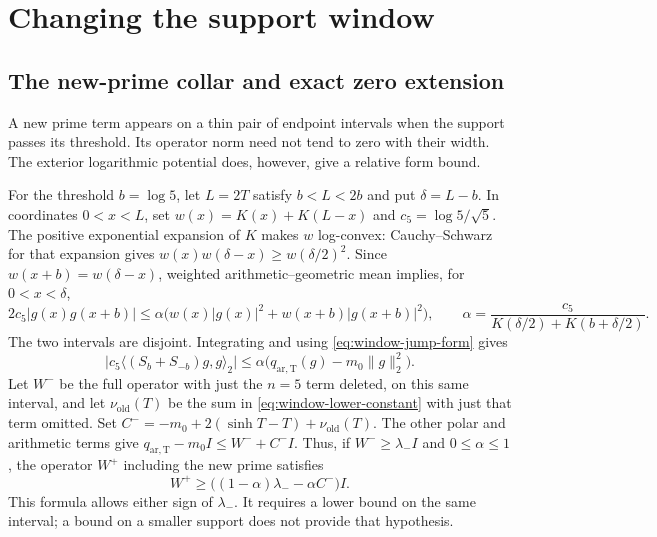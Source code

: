 \documentclass[11pt]{article}
\theoremstyle{definition}
\theoremstyle{remark}
\numberwithin{equation}{section}
\begin{document}


\section{Changing the support window}
\label{sec:window-cofinal}

\subsection{The new-prime collar and exact zero extension}

A new prime term appears on a thin pair of endpoint intervals when
the support passes its threshold.  Its operator norm need not tend
to zero with their width.  The exterior logarithmic potential does,
however, give a relative form bound.

For the threshold $b=\log5$, let $L=2T$ satisfy $b<L<2b$ and
put $\delta=L-b$.  In coordinates $0<x<L$, set
$w(x)=K(x)+K(L-x)$ and $c_5=\log5/\sqrt5$.
The positive exponential expansion of $K$ makes $w$ log-convex:
Cauchy--Schwarz for that expansion gives
$w(x)w(\delta-x)\ge w(\delta/2)^2$.
Since $w(x+b)=w(\delta-x)$, weighted arithmetic--geometric mean
implies, for $0<x<\delta$,
\[
 2c_5|g(x)g(x+b)|
 \le\alpha\bigl(w(x)|g(x)|^2+w(x+b)|g(x+b)|^2\bigr),
 \qquad
 \alpha=\frac{c_5}{K(\delta/2)+K(b+\delta/2)}.
\]
The two intervals are disjoint.  Integrating and using
\eqref{eq:window-jump-form} gives
\begin{equation}
 \bigl|c_5\langle(S_b+S_{-b})g,g\rangle_2\bigr|
  \le\alpha\bigl(q_{\mathrm{ar,T}}(g)-m_0\|g\|_2^2\bigr).
 \label{eq:window-collar-relative}
\end{equation}
Let $W^-$ be the full operator with just the $n=5$ term deleted,
on this same interval, and let $\nu_{\mathrm{old}}(T)$ be the sum in
\eqref{eq:window-lower-constant} with just that term omitted.
Set
$C^-=-m_0+2(\sinh T-T)+\nu_{\mathrm{old}}(T)$.
The other polar and arithmetic terms give
$q_{\mathrm{ar,T}}-m_0I\le W^-+C^-I$.
Thus, if $W^-\ge\lambda_-I$ and $0\le\alpha\le1$, the
operator $W^+$ including the new prime satisfies
\begin{equation}
 W^+\ge\bigl((1-\alpha)\lambda_- -\alpha C^-\bigr)I.
 \label{eq:window-collar-affine}
\end{equation}
This formula allows either sign of $\lambda_-$.  It requires a
lower bound on the same interval; a bound on a smaller support
does not provide that hypothesis.
\end{document}
